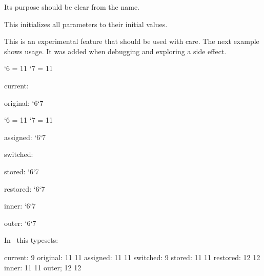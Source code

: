 \stopoldprimitive

\startnewprimitive[title={\prm {resetlocalboxes}}]

Its purpose should be clear from the name.

\stopnewprimitive

\startnewprimitive[title={\prm {resetmathspacing}}]

This initializes all parameters to their initial values.

\stopnewprimitive

\startnewprimitive[title={\prm {restorecatcodetable}}]

This is an experimental feature that should be used with care. The next example
shows usage. It was added when debugging and exploring a side effect.

\starttyping
{}

\bgroup

    \catcode`6 = 11 \catcode`7 = 11

    \bgroup


    current: \the\catcodetable

    original: \the\catcode`6\quad \the\catcode`7

    \catcode`6 = 11 \catcode`7 = 11

    \showcodestack\catcode

    assigned: \the\catcode`6\quad \the\catcode`7

    \showcodestack\catcode

    \catcodetable\ctxcatcodes switched: \the\catcodetable

    stored: \the\catcode`6\quad \the\catcode`7

    \showcodestack\catcode

    \restorecatcodetable\ctxcatcodes

    \showcodestack\catcode

    restored: \the\catcode`6\quad \the\catcode`7

    \showcodestack\catcode

    \egroup

    \catcodetable\ctxcatcodes

    inner: \the\catcode`6\quad\the\catcode`7

\egroup

outer: \the\catcode`6\quad\the\catcode`7
\stoptyping

In \CONTEXT\ this typesets:

\starttyping
current: 9
original: 11 11
assigned: 11 11
switched: 9
stored: 11 11
restored: 12 12
inner: 11 11
outer; 12 12
\stoptyping

